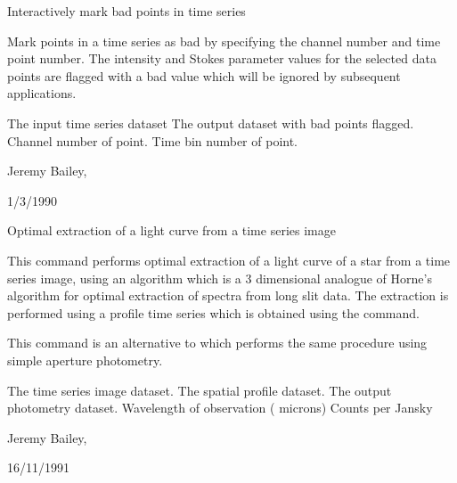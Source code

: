 \begin{manroutinedescription}
        Interactively mark bad points in time series

        Mark points in a time series as bad by specifying the channel
        number and time point number. The intensity and Stokes parameter
        values for the selected data points are flagged with a bad value
        which will be ignored by subsequent applications.

\begin{manparametertable}
  The input %
time series dataset
  The %
output dataset with
                               bad points flagged.
  Channel number of point.
  Time bin number of point.

\end{manparametertable}
         Jeremy Bailey, {}

         1/3/1990

\end{manroutinedescription}
\begin{manroutinedescription}
        Optimal extraction of a light curve from a time series image

        This command performs optimal extraction of a light curve of
        a star from a time series image, using an algorithm which is
        a 3 dimensional analogue of Horne's algorithm for optimal
        extraction of spectra from long slit data.
        The extraction is performed using a profile time series which is
        obtained using the {} command.

        This command is an alternative to {} which performs the
        same procedure using simple aperture photometry.

\begin{manparametertable}
   The time %
series image dataset.
   The %
spatial profile dataset.
   The %
output photometry dataset.
      Wavelength of observation (%
microns)
      Counts per Jansky

\end{manparametertable}
         Jeremy Bailey, {}

         16/11/1991

\end{manroutinedescription}
